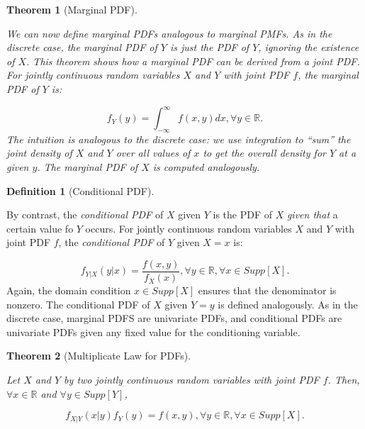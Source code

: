 \documentclass[
]{article}
\newtheorem{theorem}{Theorem}[section]
\theoremstyle{definition}
\newtheorem{definition}{Definition}[section]
\theoremstyle{definition}
\theoremstyle{definition}
\theoremstyle{remark}
\begin{document}
\begin{theorem}[Marginal PDF]
\protect\hypertarget{thm:unlabeled-div-49}{}\label{thm:unlabeled-div-49}

We can now define marginal PDFs analogous to marginal PMFs. As in the discrete case, the \emph{marginal PDF} of \(Y\) is just the PDF of \(Y\), ignoring the existence of \(X\). This theorem shows how a marginal PDF can be derived from a joint PDF. For jointly continuous random variables \(X\) and \(Y\) with joint PDF \(f\), the \emph{marginal PDF} of \(Y\) is:

\[f_Y(y) = \int_{-\infty}^\infty f(x,y) dx, \forall y \in \mathbb{R}.\]
The intuition is analogous to the discrete case: we use integration to ``sum'' the joint density of \(X\) and \(Y\) over all values of \(x\) to get the overall density for \(Y\) at a given \(y\). The marginal PDF of \(X\) is computed analogously.

\end{theorem}

\begin{definition}[Conditional PDF]
\protect\hypertarget{def:unlabeled-div-50}{}\label{def:unlabeled-div-50}

By contrast, the \emph{conditional PDF} of \(X\) given \(Y\) is the PDF of \(X\) \emph{given that} a certain value fo \(Y\) occurs. For jointly continuous random variables \(X\) and \(Y\) with joint PDF \(f\), the \emph{conditional PDF} of \(Y\) given \(X=x\) is:

\[f_{Y|X}(y|x) = \frac{f(x,y)}{f_X(x)}, \forall y \in \mathbb{R}, \forall x \in Supp[X].\]
Again, the domain condition \(x \in Supp[X]\) ensures that the denominator is nonzero. The conditional PDF of \(X\) given \(Y=y\) is defined analogously. As in the discrete case, marginal PDFS are univariate PDFs, and conditional PDFs are univariate PDFs given any fixed value for the conditioning variable.

\end{definition}

\begin{theorem}[Multiplicate Law for PDFs]
\protect\hypertarget{thm:unlabeled-div-51}{}\label{thm:unlabeled-div-51}

Let \(X\) and \(Y\) by two jointly continuous random variables with joint PDF \(f\). Then, \(\forall x \in \mathbb{R}\) and \(\forall y \in Supp[Y]\),

\[f_{X|Y}(x|y)f_Y(y) = f(x,y), \forall y \in \mathbb{R}, \forall x \in Supp[X].\]

\end{theorem}
\end{document}
